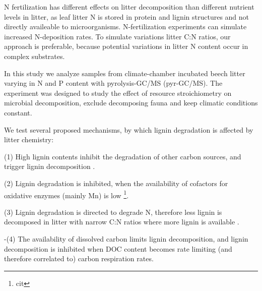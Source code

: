 \documentclass[authoryear,preprint,review,12pt]{elsarticle}
\begin{document}
N fertilization has different effects on litter decomposition than different nutrient levels in litter, as leaf litter N is stored in protein and lignin structures and not directly availeable to microorganisms. N-fertilization experiments can simulate increased N-deposition rates. To simulate variations litter C:N ratios, our approach is preferable, because potential variations in litter N content occur in complex substrates.

In this study we analyze samples from climate-chamber incubated beech litter varying in N and P content with pyrolysis-GC/MS (pyr-GC/MS). The experiment was designed to study the effect of resource stroichiometry on microbial decomposition, exclude decomposing fauna and keep climatic conditions constant.

We test several proposed mechanisms, by which lignin degradation is affected by litter chemistry:

(1) High lignin contents inhibit the degradation of other carbon sources, and trigger lignin decomposition \citep{Berg1980}.

(2) Lignin degradation is inhibited, when the availability of cofactors for oxidative enzymes (mainly Mn) is low \footnote{cit}.

(3) Lignin degradation is directed to degrade N, therefore less lignin is decomposed in litter with narrow C:N ratios where more lignin is available \citep{Craine2007}.

-(4) The availability of dissolved carbon limits lignin decomposition, and lignin decomposition is inhibited when DOC content becomes rate limiting (and therefore correlated to) carbon respiration rates\citep{Klotzbucher2011}.
\end{document}
